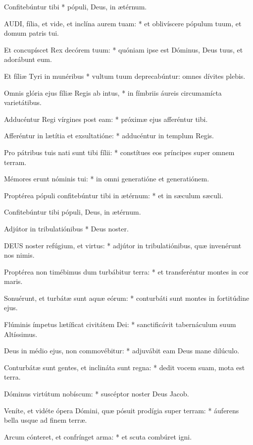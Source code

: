  Confitebúntur tibi * pópuli, Deus, in ætérnum.


\lettrine[lines=2]{A}{UDI}, fília, et vide, et inclína aurem tuam: * et oblivíscere pópulum tuum, et domum patris tui.

Et concupíscet Rex decórem tuum: * quóniam ipse est Dóminus, Deus tuus, et adorábunt eum.

Et fíliæ Tyri in munéribus * vultum tuum deprecabúntur: omnes dívites plebis.

Omnis glória ejus fíliæ Regis ab intus, * in fímbriis áureis circumamícta varietátibus.

Adducéntur Regi vírgines post eam: * próximæ ejus afferéntur tibi.

Afferéntur in lætítia et exsultatióne: * adducéntur in templum Regis.

Pro pátribus tuis nati sunt tibi fílii: * constítues eos príncipes super omnem terram.

Mémores erunt nóminis tui: * in omni generatióne et generatiónem.

Proptérea pópuli confitebúntur tibi in ætérnum: * et in sæculum sæculi.

 Confitebúntur tibi pópuli, Deus, in ætérnum.

 Adjútor in tribulatiónibus * Deus noster.


\lettrine[lines=2]{D}{EUS} noster refúgium, et virtus: * adjútor in tribulatiónibus, quæ invenérunt nos nimis.

Proptérea non timébimus dum turbábitur terra: * et transferéntur montes in cor maris.

Sonuérunt, et turbátæ sunt aquæ eórum: * conturbáti sunt montes in fortitúdine ejus.

Flúminis ímpetus lætíficat civitátem Dei: * sanctificávit tabernáculum suum Altíssimus.

Deus in médio ejus, non commovébitur: * adjuvábit eam Deus mane dilúculo.

Conturbátæ sunt gentes, et inclináta sunt regna: * dedit vocem suam, mota est terra.

Dóminus virtútum nobíscum: * suscéptor noster Deus Jacob.

Veníte, et vidéte ópera Dómini, quæ pósuit prodígia super terram: * áuferens bella usque ad finem terræ.

Arcum cónteret, et confrínget arma: * et scuta combúret igni.

